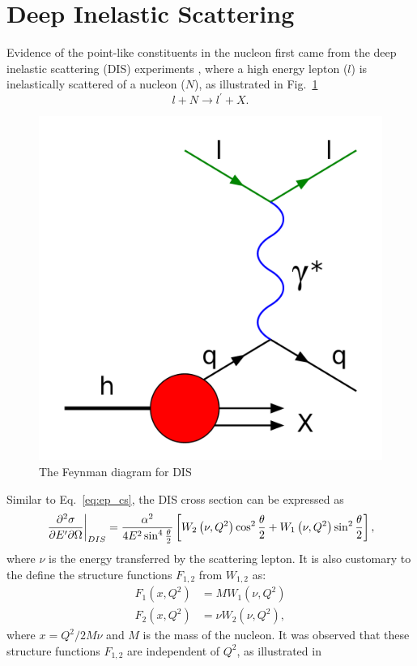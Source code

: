 \section {Deep Inelastic Scattering}
\label{sec:dis}
Evidence of the point-like constituents in the nucleon first came from the deep
inelastic scattering (DIS) experiments \cite{breidenbach1969}, where a high 
energy lepton ($l$) is inelastically scattered of a nucleon ($N$), as 
illustrated in Fig.\ \ref{fig:DIS}
\begin{equation}
	l + N \rightarrow l^\prime + X.
\end{equation}
\begin{figure}[htbp!]
    \centering
    \includegraphics[width=0.5\linewidth]{./images/DIS}
    \caption{The Feynman diagram for DIS}
    \label{fig:DIS}
\end{figure}
Similar to Eq.\ \ref{eq:ep_cs}, the DIS cross section can be expressed as 
\begin{equation}
	\eval{\pdv{\sigma}{E^\prime}{\Omega}}_{DIS} = \frac{\alpha^2}{4E^2 \sin^4 
	\frac{\theta}{2}} \left[ W_2\left(\nu,Q^2\right)\cos^2
	\frac{\theta}{2} + W_1\left(\nu,Q^2\right)\sin^2 \frac{\theta}{2}
	\right],
	\label{eq:DIS_cs1}
\end{equation}
where $\nu$ is the energy transferred by the scattering lepton. It is also 
customary to the define the structure functions $F_{1,2}$ from $W_{1,2}$ as:
\begin{equation}
	\begin{split}
		F_1\left(x,Q^2\right) &= MW_1\left(\nu,Q^2\right)\\
		F_2\left(x,Q^2\right) &= \nu W_2\left(\nu,Q^2\right),
	\end{split}
\end{equation}
where $x=Q^2/2M\nu$ and $M$ is the mass of the nucleon. It was observed that 
these structure functions $F_{1,2}$ are independent of $Q^2$, as illustrated in
